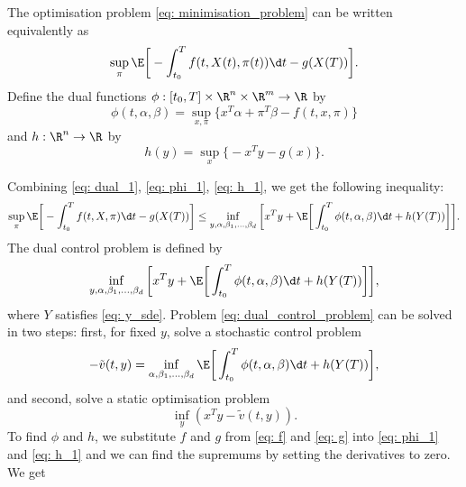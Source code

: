 The optimisation problem \eqref{eq: minimisation_problem} can be written equivalently as 
\begin{equation*}
    \sup_\pi \E \bigg[ -\int_{t_0}^T f(t,X(t), \pi(t)) \d t - g(X(T)) \bigg].
\end{equation*}
Define the dual functions $\phi : [t_0, T] \times \R^n \times \R^m \to \R$ by
\begin{equation}
    \phi(t, \alpha, \beta) = \sup_{x, \pi} \big\{x^T \alpha + \pi^T \beta - f(t, x, \pi) \big\} \label{eq: phi_1}
\end{equation}
and $h: \R^n \to \R$ by
\begin{equation}
    h(y) = \sup_x \big\{-x^T y - g(x)\big\}. 
    \label{eq: h_1}
\end{equation}

Combining \eqref{eq: dual_1}, \eqref{eq: phi_1}, \eqref{eq: h_1}, we get the following inequality:
\begin{equation}
    \sup_\pi \E \bigg[ -\int_{t_0}^T f(t, X,\pi) \d t - g(X(T)) \bigg] \le \inf_{y, \alpha, \beta_1, \dots, \beta_d} \bigg[ x^T y + \E\bigg[\int_{t_0}^T \phi(t,\alpha, \beta ) \d t + h(Y(T)) \bigg] \bigg]. \label{eq: dual_primal_inequality}
\end{equation}
The dual control problem is defined by
\begin{equation}
    \inf_{y, \alpha, \beta_1, \dots, \beta_d} \bigg[ x^T y + \E\bigg[\int_{t_0}^T \phi(t,\alpha, \beta) \d t + h(Y(T)) \bigg] \bigg], \label{eq: dual_control_problem}
\end{equation}
where $Y$ satisfies \eqref{eq: y_sde}. Problem \eqref{eq: dual_control_problem} can be solved in two steps: first, for fixed $y$, solve a stochastic control problem
\begin{equation}
    - \tilde{v}(t, y) = \inf_{ \alpha, \beta_1, \dots, \beta_d} \E\bigg[\int_{t_0}^T \phi (t, \alpha, \beta) \d t + h(Y(T)) \bigg], \label{eq: dual_value_function}
\end{equation}
and second, solve a static optimisation problem
\begin{equation*}
    \inf_y (x^T y - \tilde{v}(t, y)).
\end{equation*}
To find $\phi$ and $h$, we substitute $f$ and $g$ from \eqref{eq: f} and \eqref{eq: g} into \eqref{eq: phi_1} and \eqref{eq: h_1} and we can find the supremums by setting the derivatives to zero. We get
